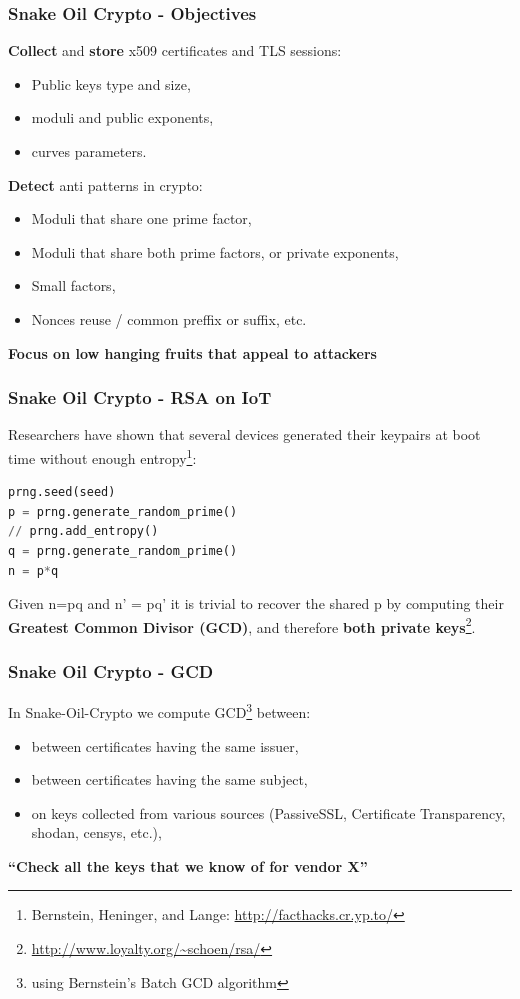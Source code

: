 \documentclass{beamer}
\begin{document}
\begin{frame}
   \frametitle{Snake Oil Crypto -  Objectives}
   {\bf Collect} and {\bf store} x509 certificates and TLS sessions:
        \begin{itemize}
        \item Public keys type and size,
        \item moduli and public exponents,
        \item curves parameters.
        \end{itemize}
        {\bf Detect} anti patterns in crypto:
        \begin{itemize}
          \item Moduli that share one prime factor,
          \item Moduli that share both prime factors, or private exponents,
          \item Small factors,
          \item Nonces reuse / common preffix or suffix, etc. 
        \end{itemize}
        \vspace{5 mm}
        {\bf Focus on low hanging fruits that appeal to attackers}
\end{frame}


\begin{frame}[fragile]
   \frametitle{Snake Oil Crypto - RSA on IoT }
   Researchers have shown that several devices generated their keypairs
   at boot time without enough entropy\footnote{Bernstein, Heninger, and Lange: \url{http://facthacks.cr.yp.to/}}:
   
\begin{lstlisting}[frame=single, language=python]
prng.seed(seed)
p = prng.generate_random_prime()
// prng.add_entropy()
q = prng.generate_random_prime()
n = p*q
\end{lstlisting}

Given n=pq and n' = pq' it is trivial to recover the shared p by computing their
{\bf Greatest Common Divisor (GCD)}, and therefore {\bf both private keys}\footnote{\url{http://www.loyalty.org/~schoen/rsa/}}.

\end{frame}

\begin{frame}
   \frametitle{Snake Oil Crypto - GCD}
   In Snake-Oil-Crypto we compute GCD\footnote{using Bernstein's Batch GCD algorithm} between:
   
   \begin{itemize}
     \item between certificates having the same issuer,
     \item between certificates having the same subject,
     \item on keys collected from various sources (PassiveSSL, Certificate Transparency,
       shodan, censys, etc.),
   \end{itemize}

\vspace{10 mm}
  {\bf ``Check all the keys that we know of for vendor X''}

\end{frame}
\end{document}
